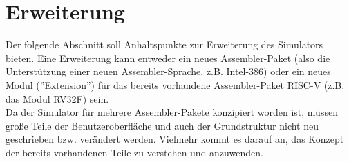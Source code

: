 
\section{Erweiterung}
Der folgende Abschnitt soll Anhaltspunkte zur Erweiterung des Simulators bieten. Eine Erweiterung kann entweder ein neues Assembler-Paket (also die Unterstützung einer neuen Assembler-Sprache, z.B. Intel-386) oder ein neues Modul (''Extension'') für das bereits vorhandene Assembler-Paket RISC-V (z.B. das Modul RV32F) sein.\\

Da der Simulator für mehrere Assembler-Pakete konzipiert worden ist, müssen große Teile der Benutzeroberfläche und auch der Grundstruktur nicht neu geschrieben bzw. verändert werden. Vielmehr kommt es darauf an, das Konzept der bereits vorhandenen Teile zu verstehen und anzuwenden.

